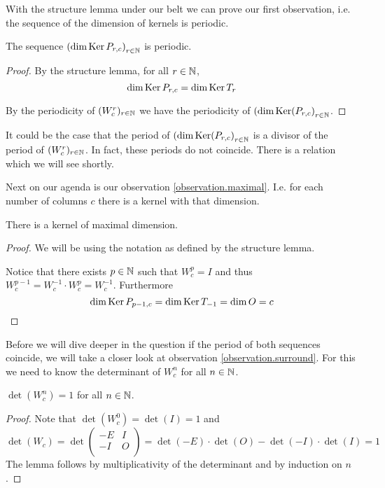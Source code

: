 With the structure lemma under our belt we can prove our first observation, i.e.
the sequence of the dimension of kernels is periodic.

\begin{proposition}
  The sequence $\left(\dim \operatorname{Ker} P_{r,c}\right)_{r\in\mathbb{N}}$ is periodic.
\end{proposition}

\begin{proof}
  By the structure lemma, for all $r\in\mathbb{N}$,
  \[
  \dim\operatorname{Ker} P_{r,c}
  =
  \dim\operatorname{Ker} T_{r}
  \]

  By the periodicity of $(W_{c}^{r})_{r\in\mathbb{N}}$ we have the
  periodicity of $\left(\dim\operatorname{Ker}(P_{r,c}\right)_{r\in\mathbb{N}}$.
\end{proof}

It could be the case that the period of $\left(\dim\operatorname{Ker}(P_{r,c}\right)_{r\in\mathbb{N}}$
is a divisor of the period of $(W_{c}^{r})_{r\in\mathbb{N}}$. In fact, these periods do
not coincide. There is a relation which we will see shortly.

Next on our agenda is our observation \ref{observation.maximal}. I.e. for each
number of columns $c$ there is a kernel with that dimension.

\begin{lemma}
  There is a kernel of maximal dimension.
\end{lemma}

\begin{proof}
  We will be using the notation as defined by the structure lemma.

  Notice that there exists $p\in\mathbb{N}$ such that $W_{c}^{p} = I$ and
  thus $W_{c}^{p-1} = W_{c}^{-1} \cdot W_{c}^{p} = W_{c}^{-1}$.
  Furthermore
  \[
  \dim\operatorname{Ker} P_{p-1,c}
  =
  \dim\operatorname{Ker} T_{-1}
  =
  \dim O
  = c
  \]
\end{proof}

Before we will dive deeper in the question if the period of both sequences
coincide, we will take a closer look at observation \ref{observation.surround}.
For this we need to know the determinant of $W_{c}^{n}$ for all $n\in\mathbb{N}$.

\begin{lemma}
  $\det(W_{c}^{n}) = 1$ for all $n\in\mathbb{N}$.
\end{lemma}

\begin{proof}
  Note that $\det(W_{c}^{0}) = \det(I) = 1$ and
  \[
  \det(W_{c}) = \det
  \left(
  \begin{array}{cc}
    -E & I \\
    -I & O \\
  \end{array}
  \right)
  =
  \det(-E) \cdot \det(O) - \det(-I) \cdot \det(I)
  =
  1
  \]
  The lemma follows by multiplicativity of the determinant and
  by induction on $n$.
\end{proof}

